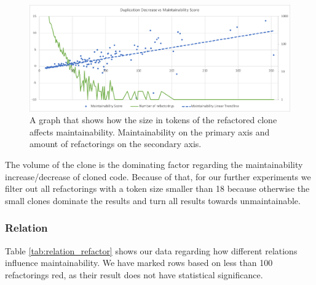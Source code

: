 \documentclass[sigconf,review, table]{acmart}
\begin{document}
\begin{figure}
  \includegraphics[width=1\textwidth]{img/duplication}
  \caption{A graph that shows how the size in tokens of the refactored clone affects maintainability. Maintainability on the primary axis and amount of refactorings on the secondary axis.}
  \label{fig:duplication}
\end{figure}

The volume of the clone is the dominating factor regarding the maintainability increase/decrease of cloned code. Because of that, for our further experiments we filter out all refactorings with a token size smaller than 18 because otherwise the small clones dominate the results and turn all results towards unmaintainable.

\subsubsection{Relation}
Table \ref{tab:relation_refactor} shows our data regarding how different relations influence maintainability. We have marked rows based on less than 100 refactorings red, as their result does not have statistical significance.
\end{document}
